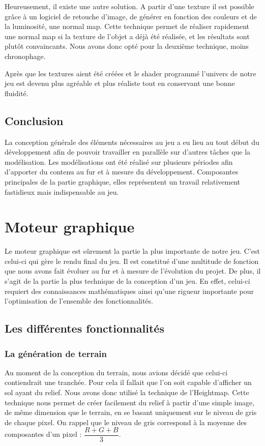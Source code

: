 \documentclass[11pt]{report}
\begin{document}
Heureusement, il existe une autre solution. A partir d'une texture il est possible grâce à un logiciel de retouche d'image, de générer en fonction des couleurs et de la luminosité, une normal map.
Cette technique permet de réaliser rapidement une normal map si la texture de l'objet a déjà été réalisée, et les résultats sont plutôt convaincants. Nous avons donc opté pour la deuxième technique, moins chronophage.

Après que les textures aient été créées et le shader programmé l’univers de notre jeu est devenu plus agréable et plus réaliste tout en conservant une bonne fluidité. 

\section{Conclusion}

La conception générale des éléments nécessaires au jeu a eu lieu au tout début du développement afin de pouvoir travailler en parallèle sur d’autres tâches que la modélisation. Les modélisations ont été réalisé sur plusieurs périodes afin d’apporter du contenu au fur et à mesure du développement. Composantes principales de la partie graphique, elles représentent un travail relativement fastidieux mais indispensable au jeu. 

\chapter{Moteur graphique}

Le moteur graphique est sûrement la partie la plus importante de notre jeu. C'est celui-ci qui gère le rendu final du jeu. Il est constitué d'une multitude de fonction que nous avons fait évoluer au fur et à mesure de l'évolution du projet. De plus, il s'agit de la partie la plus technique de la conception d'un jeu. En effet, celui-ci requiert des connaissances mathématiques ainsi qu'une rigueur importante pour l'optimisation de l'ensemble des fonctionnalités.

\section{Les différentes fonctionnalités}

\subsection{La génération de terrain}

Au moment de la conception du terrain, nous avions décidé que celui-ci contiendrait une tranchée. Pour cela il fallait que l'on soit capable d'afficher un sol ayant du relief. Nous avons donc utilisé la technique de l'Heightmap. Cette technique nous permet de créer facilement du relief à partir d'une simple image, de même dimension que le terrain, en se basant uniquement sur le niveau de gris de chaque pixel. On rappel que le niveau de gris correspond à la moyenne des composantes d'un pixel : \( \dfrac{R + G + B}{3} \). 
\end{document}
